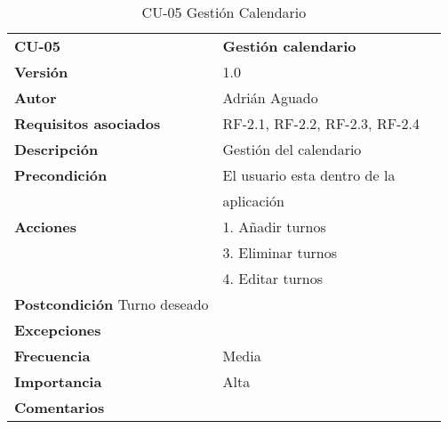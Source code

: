 \begin{table}
\begin{tabular}{llr}  
\toprule
\begin{minipage}[b]{0.24\columnwidth}\raggedright\strut
\textbf{CU-05}\strut
\end{minipage} & \begin{minipage}[b]{0.72\columnwidth}\raggedright\strut
\textbf{Gestión calendario}\strut
\end{minipage}\tabularnewline
\cmidrule(r){1-2}
\textbf{Versión}       & 1.0           \\
\textbf{Autor}       & Adrián  Aguado    \\
\textbf{Requisitos asociados}       & RF-2.1, RF-2.2, RF-2.3, RF-2.4  \\ 
\textbf{Descripción} & Gestión del calendario\\
\textbf{Precondición} & El usuario esta dentro de la \\
& aplicación       \\
\textbf{Acciones} & 1. Añadir turnos \\
& 3. Eliminar turnos \\
& 4. Editar turnos \\
\textbf{Postcondición} Turno deseado \\
\textbf{Excepciones} &     \\
\textbf{Frecuencia} & Media          \\
\textbf{Importancia} & Alta            \\
\textbf{Comentarios } &      \\
\bottomrule
\end{tabular}
\caption{CU-05 Gestión Calendario} 
\end{table}

